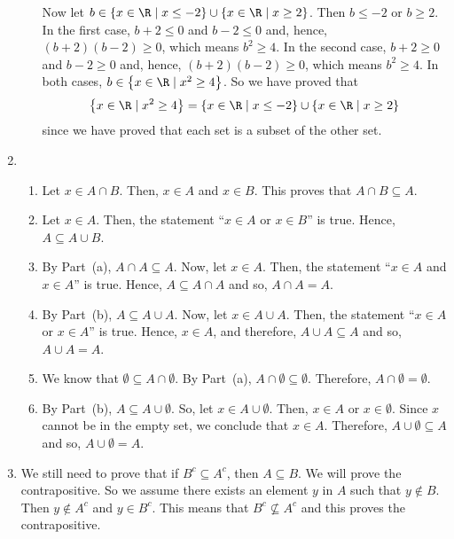 \begin{enumerate}
\begin{enumerate}
Now let 
$b \in \left\{x \in \R \mid x \leq -2 \right\} \cup \left\{x \in \R \mid x \geq 2 \right\}$.  Then $b \leq -2$ or $b \geq 2$.  In the first case, $b + 2 \leq 0$ and $b - 2 \leq 0$ and, hence, 
$(b + 2)(b - 2) \geq 0$, which means $b^2 \geq 4$.  In the second case, $b + 2 \geq 0$ and 
$b - 2 \geq 0$ and, hence, $(b + 2)(b - 2) \geq 0$, which means $b^2 \geq 4$.  In both cases, 
$b \in \left\{x \in \R \mid x^2 \geq 4 \right\}$.  So we have proved that
\[
\left\{x \in \R \mid x^2 \geq 4 \right\} = \left\{x \in \R \mid x \leq -2 \right\} \cup \left\{x \in \R \mid x \geq 2 \right\}
\]
since we have proved that each set is a subset of the other set.
\end{enumerate}


\item \begin{enumerate}
\item Let $x \in A \cap B$.  Then, $x \in A$ and $x \in B$.  This proves that 
$A \cap B \subseteq A$.

\item Let $x \in A$.  Then, the statement ``$x \in A$ or $x \in B$'' is true.  Hence, 
$A \subseteq A \cup B$.

\item By Part~(a), $A \cap A \subseteq A$.  Now, let $x \in A$.  Then, the statement 
``$x \in A$ and $x \in A$'' is true.  Hence, $A \subseteq A \cap A$ and so, $A \cap A = A$.

\item By Part~(b), $A \subseteq A \cup A$.  Now, let $x \in A \cup A$.  Then, the statement 
``$x \in A$ or $x \in A$'' is true.  Hence, $x \in A$, and therefore, $A \cup A \subseteq A$ and so, $A \cup A = A$.

\item We know that $\emptyset \subseteq A \cap \emptyset$.  By Part~(a), 
$A \cap \emptyset \subseteq \emptyset$.  Therefore, $A \cap \emptyset = \emptyset$.

\item By Part~(b), $A \subseteq A \cup \emptyset$.  So, let $x \in A \cup \emptyset$.  Then, 
$x \in A$ or $x \in \emptyset$.  Since $x$ cannot be in the empty set, we conclude that $x \in A$.  Therefore, $A \cup \emptyset \subseteq A$ and so, $A \cup \emptyset = A$.
\end{enumerate}


\item We still need to prove that if $B^c \subseteq A^c$, then $A \subseteq B$.  We will prove the contrapositive.  So we assume there exists an element $y$ in $A$ such that $y \notin B$.  Then $y \notin A^c$ and $y \in B^c$.  This means that $B^c \not\subseteq A^c$ and this proves the contrapositive.



\end{enumerate}
